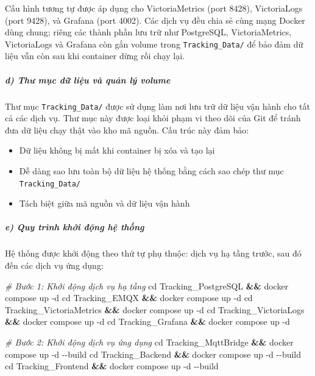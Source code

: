 \documentclass[a4paper]{extarticle}
\newenvironment{Shaded}{}{}
\newcommand{\AttributeTok}[1]{\textcolor[rgb]{0.49,0.56,0.16}{#1}}
\newcommand{\BuiltInTok}[1]{\textcolor[rgb]{0.00,0.50,0.00}{#1}}
\newcommand{\CommentTok}[1]{\textcolor[rgb]{0.38,0.63,0.69}{\textit{#1}}}
\newcommand{\ExtensionTok}[1]{#1}
\newcommand{\KeywordTok}[1]{\textcolor[rgb]{0.00,0.44,0.13}{\textbf{#1}}}
\newcommand{\NormalTok}[1]{#1}
\providecommand{\tightlist}{%
  \setlength{\itemsep}{0pt}\setlength{\parskip}{0pt}}
\begin{document}
Cấu hình tương tự được áp dụng cho VictoriaMetrics (port 8428),
VictoriaLogs (port 9428), và Grafana (port 4002). Các dịch vụ đều chia
sẻ cùng mạng Docker dùng chung; riêng các thành phần lưu trữ như
PostgreSQL, VictoriaMetrics, VictoriaLogs và Grafana còn gắn volume
trong \texttt{Tracking\_Data/} để bảo đảm dữ liệu vẫn còn sau khi container
dừng rồi chạy lại.

\subparagraph{d) Thư mục dữ liệu và quản lý
volume}\label{d-thux1b0-mux1ee5c-dux1eef-liux1ec7u-vuxe0-quux1ea3n-luxfd-volume}

Thư mục \texttt{Tracking\_Data/} được sử dụng làm nơi lưu trữ dữ liệu
vận hành cho tất cả các dịch vụ. Thư mục này được loại khỏi phạm vi theo
dõi của Git để tránh đưa dữ liệu chạy thật vào kho mã nguồn.
Cấu trúc này đảm bảo:

\begin{itemize}
\tightlist
\item
  Dữ liệu không bị mất khi container bị xóa và tạo lại
\item
  Dễ dàng sao lưu toàn bộ dữ liệu hệ thống bằng cách sao chép
  thư mục \texttt{Tracking\_Data/}
\item
  Tách biệt giữa mã nguồn và dữ liệu vận hành
\end{itemize}

\subparagraph{e) Quy trình khởi động hệ
thống}\label{e-quy-truxecnh-khux1edfi-ux111ux1ed9ng-hux1ec7-thux1ed1ng}

Hệ thống được khởi động theo thứ tự phụ thuộc: dịch vụ hạ tầng trước,
sau đó đến các dịch vụ ứng dụng:

\begin{Shaded}
\begin{Highlighting}[]
\CommentTok{\# Bước 1: Khởi động dịch vụ hạ tầng}
\BuiltInTok{cd}\NormalTok{ Tracking\_PostgreSQL }\KeywordTok{\&\&} \ExtensionTok{docker}\NormalTok{ compose up }\AttributeTok{{-}d}
\BuiltInTok{cd}\NormalTok{ Tracking\_EMQX }\KeywordTok{\&\&} \ExtensionTok{docker}\NormalTok{ compose up }\AttributeTok{{-}d}
\BuiltInTok{cd}\NormalTok{ Tracking\_VictoriaMetrics }\KeywordTok{\&\&} \ExtensionTok{docker}\NormalTok{ compose up }\AttributeTok{{-}d}
\BuiltInTok{cd}\NormalTok{ Tracking\_VictoriaLogs }\KeywordTok{\&\&} \ExtensionTok{docker}\NormalTok{ compose up }\AttributeTok{{-}d}
\BuiltInTok{cd}\NormalTok{ Tracking\_Grafana }\KeywordTok{\&\&} \ExtensionTok{docker}\NormalTok{ compose up }\AttributeTok{{-}d}

\CommentTok{\# Bước 2: Khởi động dịch vụ ứng dụng}
\BuiltInTok{cd}\NormalTok{ Tracking\_MqttBridge }\KeywordTok{\&\&} \ExtensionTok{docker}\NormalTok{ compose up }\AttributeTok{{-}d} \AttributeTok{{-}{-}build}
\BuiltInTok{cd}\NormalTok{ Tracking\_Backend }\KeywordTok{\&\&} \ExtensionTok{docker}\NormalTok{ compose up }\AttributeTok{{-}d} \AttributeTok{{-}{-}build}
\BuiltInTok{cd}\NormalTok{ Tracking\_Frontend }\KeywordTok{\&\&} \ExtensionTok{docker}\NormalTok{ compose up }\AttributeTok{{-}d} \AttributeTok{{-}{-}build}
\end{Highlighting}
\end{Shaded}
\end{document}
